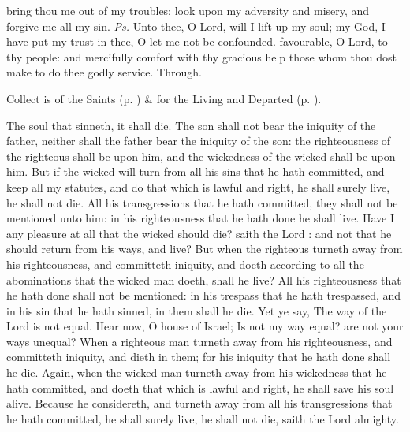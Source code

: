 \introit
{} bring thou me out of my troubles: look upon my adversity and misery, and forgive me all my sin. \textit{Ps.} Unto thee, O Lord, will I lift up my soul; my God, I have put my trust in thee, O let me not be confounded.
\collect
{} favourable, O Lord, to thy people: and mercifully comfort with thy gracious help those whom thou dost make to do thee godly service. Through.
\begin{rubric}
     Collect is of the Saints (p. \pageref{SPSaints}) \&  for the Living and Departed (p. \pageref{SPLivingDeparted}).
\end{rubric}
 The soul that sinneth, it shall die. The son shall not bear the iniquity of the father, neither shall the father bear the iniquity of the son: the righteousness of the righteous shall be upon him, and the wickedness of the wicked shall be upon him. But if the wicked will turn from all his sins that he hath committed, and keep all my statutes, and do that which is lawful and right, he shall surely live, he shall not die. All his transgressions that he hath committed, they shall not be mentioned unto him: in his righteousness that he hath done he shall live. Have I any pleasure at all that the wicked should die? saith the Lord : and not that he should return from his ways, and live? But when the righteous turneth away from his righteousness, and committeth iniquity, and doeth according to all the abominations that the wicked man doeth, shall he live? All his righteousness that he hath done shall not be mentioned: in his trespass that he hath trespassed, and in his sin that he hath sinned, in them shall he die. Yet ye say, The way of the Lord is not equal. Hear now, O house of Israel; Is not my way equal? are not your ways unequal? When a righteous man turneth away from his righteousness, and committeth iniquity, and dieth in them; for his iniquity that he hath done shall he die. Again, when the wicked man turneth away from his wickedness that he hath committed, and doeth that which is lawful and right, he shall save his soul alive. Because he considereth, and turneth away from all his transgressions that he hath committed, he shall surely live, he shall not die, saith the Lord almighty.
